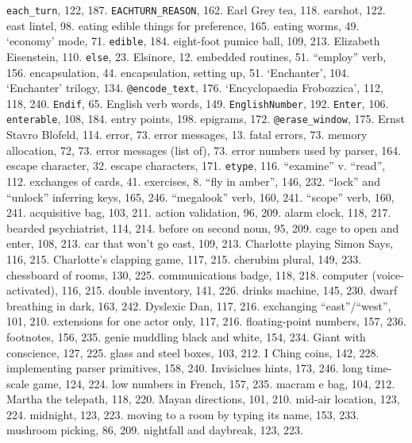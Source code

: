 {{\tt each\_turn}}, 122, 187.
{{\tt EACHTURN\_REASON}}, 162.
Earl Grey tea, 118.
earshot, 122.
east lintel, 98.
eating edible things for preference, 165.
eating worms, 49.
`economy' mode, 71.
{{\tt edible}}, 184.
eight-foot pumice ball, 109, 213.
Elizabeth Eisenstein, 110.
{{\tt else}}, 23.
Elsinore, 12.
embedded routines, 51.
``employ'' verb, 156.
encapsulation, 44.
encapsulation, setting up, 51.
`Enchanter', 104.
`Enchanter' trilogy, 134.
{{\tt @encode\_text}}, 176.
`Encyclopaedia Frobozzica', 112, 118, 240.
{{\tt Endif}}, 65.
English verb words, 149.
{{\tt EnglishNumber}}, 192.
{{\tt Enter}}, 106.
{{\tt enterable}}, 108, 184.
entry points, 198.
epigrams, 172.
{{\tt @erase\_window}}, 175.
Ernst Stavro Blofeld, 114.
error, 73.
error messages, 13.
\quad  fatal errors, 73.
\quad  memory allocation, 72, 73.
error messages (list of), 73.
error numbers used by parser, 164.
escape character, 32.
escape characters, 171.
{{\tt etype}}, 116.
``examine'' v. ``read'', 112.
exchanges of cards, 41.
exercises, 8.
\quad  ``fly in amber'', 146, 232.
\quad  ``lock'' and ``unlock'' inferring keys, 165, 246.
\quad  ``megalook'' verb, 160, 241.
\quad  ``scope'' verb, 160, 241.
\quad  acquisitive bag, 103, 211.
\quad  action validation, 96, 209.
\quad  alarm clock, 118, 217.
\quad  bearded psychiatrist, 114, 214.
\quad  before on second noun, 95, 209.
\quad  cage to open and enter, 108, 213.
\quad  car that won't go east, 109, 213.
\quad  Charlotte playing Simon Says, 116, 215.
\quad  Charlotte's clapping game, 117, 215.
\quad  cherubim plural, 149, 233.
\quad  chessboard of rooms, 130, 225.
\quad  communications badge, 118, 218.
\quad  computer (voice-activated), 116, 215.
\quad  double inventory, 141, 226.
\quad  drinks machine, 145, 230.
\quad  dwarf breathing in dark, 163, 242.
\quad  Dyslexic Dan, 117, 216.
\quad  exchanging ``east''/``west'', 101, 210.
\quad  extensions for one actor only, 117, 216.
\quad  floating-point numbers, 157, 236.
\quad  footnotes, 156, 235.
\quad  genie muddling black and white, 154, 234.
\quad  Giant with conscience, 127, 225.
\quad  glass and steel boxes, 103, 212.
\quad  I Ching coins, 142, 228.
\quad  implementing parser primitives, 158, 240.
\quad  Invisiclues hints, 173, 246.
\quad  long time-scale game, 124, 224.
\quad  low numbers in French, 157, 235.
\quad  macram{ e} bag, 104, 212.
\quad  Martha the telepath, 118, 220.
\quad  Mayan directions, 101, 210.
\quad  mid-air location, 123, 224.
\quad  midnight, 123, 223.
\quad  moving to a room by typing its name, 153, 233.
\quad  mushroom picking, 86, 209.
\quad  nightfall and daybreak, 123, 223.
